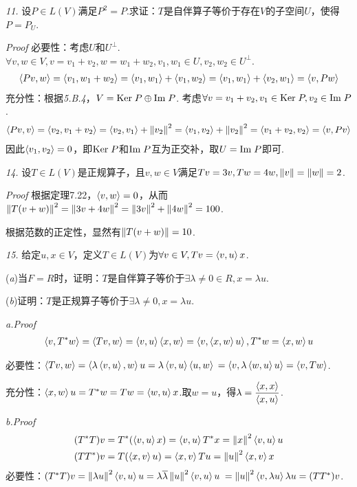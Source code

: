 \hspace*{\fill}

\textit{11.}
设\(P \in L(V)\)满足\(P^2=P\).求证：\(T\)是自伴算子等价于存在\(V\)的子空间\(U\)，使得\(P=P_U\).

\textit{Proof}
必要性：考虑\(U\)和\(U^\bot\).\(\forall v,w \in V,v=v_1+v_2,w=w_1+w_2,v_1,w_1 \in U,v_2,w_2 \in U^\bot\).
    \begin{align*}
        \ip{Pv}{w}=\ip{v_1}{w_1+w_2}=\ip{v_1}{w_1}+\ip{v_1}{w_2}=\ip{v_1}{w_1}+\ip{v_2}{w_1}=\ip{v}{Pw}
    \end{align*}
充分性：根据\textit{5.B.4}，\(V= \Ker P \oplus \Img P\).
考虑\(\forall v=v_1+v_2,v_1 \in \Ker P,v_2 \in \Img P\).
    \begin{align*}
        \ip{Pv}{v}=\ip{v_2}{v_1+v_2}=\ip{v_2}{v_1}+\norm{v_2}^2
        =\ip{v_1}{v_2}+\norm{v_2}^2=\ip{v_1+v_2}{v_2}=\ip{v}{Pv}
    \end{align*}
因此\(\ip{v_1}{v_2}=0\)，即\(\Ker P\)和\(\Img P\)互为正交补，取\(U=\Img P\)即可.

\newpage

\textit{14.}
设\(T \in L(V)\)是正规算子，且\(v,w \in V\)满足\(Tv=3v,Tw=4w,\norm{v}=\norm{w}=2\).

\textit{Proof}
根据定理7.22，\(\ip{v}{w}=0\)，从而\(\norm{T(v+w)}^2=\norm{3v+4w}^2=\norm{3v}^2+\norm{4w}^2=100\).

根据范数的正定性，显然有\(\norm{T(v+w)}=10\).

\hspace*{\fill}

\textit{15.}
给定\(u,x \in V\)，定义\(T \in L(V)\)为\(\forall v \in V,Tv=\ip{v}{u}x\).

(\textit{a})当\(F=R\)时，证明：\(T\)是自伴算子等价于\(\exists \lambda \ne 0 \in R,x=\lambda u\).

(\textit{b})证明：\(T\)是正规算子等价于\(\exists \lambda \ne 0,x=\lambda u\).

\textit{a.Proof}
    \begin{align*}
        \ip{v}{T^*w}=\ip{Tv}{w}=\ip{v}{u}\ip{x}{w}=\ip{v}{\ip{x}{w}u},T^*w=\ip{x}{w}u
    \end{align*}

必要性：\(\ip{Tv}{w}=\ip{\lambda \ip{v}{u}}{w}u=\lambda \ip{v}{u} \ip{u}{w}\)
\(=\ip{v}{\lambda \ip{w}{u}u}=\ip{v}{Tw}\).

充分性：\(\ip{x}{w}u=T^*w=Tw=\ip{w}{u}x\).取\(w=u\)，得\(\lambda=\dfrac{\ip{x}{x}}{\ip{x}{u}}\).

\textit{b.Proof}
    \begin{align*}
        &(T^*T)v=T^*(\ip{v}{u}x)=\ip{v}{u}T^*x=\norm{x}^2\ip{v}{u}u \\
        &(TT^*)v=T(\ip{x}{v}u)=\ip{x}{v}Tu=\norm{u}^2\ip{x}{v}x
    \end{align*}
必要性：\((T^*T)v=\norm{\lambda u}^2 \ip{v}{u}u=\lambda \overline{\lambda} \norm{u}^2 \ip{v}{u}u\)
\(=\norm{u}^2 \ip{v}{\lambda u}\lambda u=(TT^*)v\).

